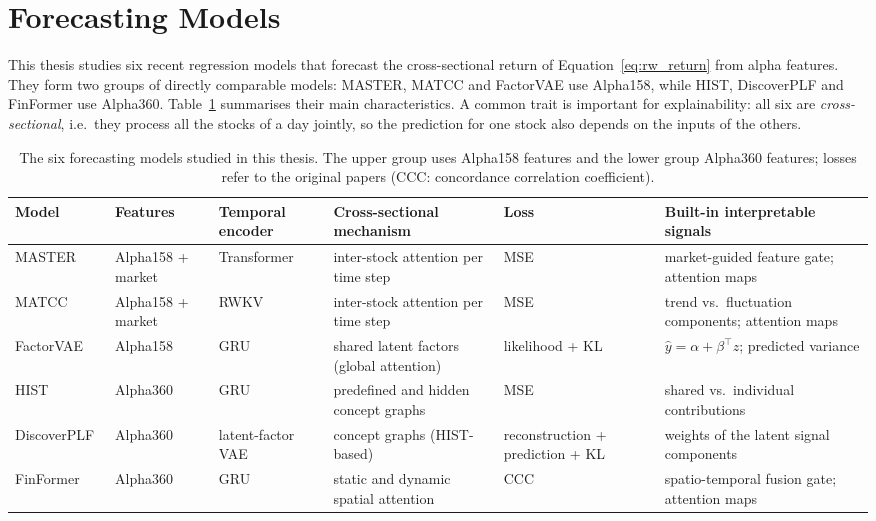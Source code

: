 \section{Forecasting Models}
\label{sec:rw_models}

This thesis studies six recent regression models that forecast the cross-sectional return of Equation~\ref{eq:rw_return} from alpha features. They form two groups of directly comparable models: MASTER, MATCC and FactorVAE use Alpha158, while HIST, DiscoverPLF and FinFormer use Alpha360. Table~\ref{tab:rw_models} summarises their main characteristics. A common trait is important for explainability: all six are \emph{cross-sectional}, i.e.\ they process all the stocks of a day jointly, so the prediction for one stock also depends on the inputs of the others.

\begin{table}[htbp]
    \centering
    \footnotesize
    \setlength{\tabcolsep}{4pt}
    \begin{adjustbox}{max width=\textwidth}
    \begin{tabular}{@{}p{1.6cm}p{1.5cm}p{2.3cm}p{3.3cm}p{2.1cm}p{3.4cm}@{}}
        \toprule
        \textbf{Model} & \textbf{Features} & \textbf{Temporal encoder} & \textbf{Cross-sectional mechanism} & \textbf{Loss} & \textbf{Built-in interpretable signals} \\
        \midrule
        MASTER~\cite{li2024master} & Alpha158 + market & Transformer & inter-stock attention per time step & MSE & market-guided feature gate; attention maps \\
        MATCC~\cite{cao2024matcc} & Alpha158 + market & RWKV & inter-stock attention per time step & MSE & trend vs.\ fluctuation components; attention maps \\
        FactorVAE~\cite{duan2022factorvae} & Alpha158 & GRU & shared latent factors (global attention) & likelihood + KL & $\hat{y} = \alpha + \beta^{\top} z$; predicted variance \\
        \midrule
        HIST~\cite{xu2021hist} & Alpha360 & GRU & predefined and hidden concept graphs & MSE & shared vs.\ individual contributions \\
        DiscoverPLF~\cite{hou2024discovering} & Alpha360 & latent-factor VAE & concept graphs (HIST-based) & reconstruction + prediction + KL & weights of the latent signal components \\
        FinFormer~\cite{zu2023finformer} & Alpha360 & GRU & static and dynamic spatial attention & CCC & spatio-temporal fusion gate; attention maps \\
        \bottomrule
    \end{tabular}
    \end{adjustbox}
    \caption{The six forecasting models studied in this thesis. The upper group uses Alpha158 features and the lower group Alpha360 features; losses refer to the original papers (CCC: concordance correlation coefficient).}
    \label{tab:rw_models}
\end{table}

